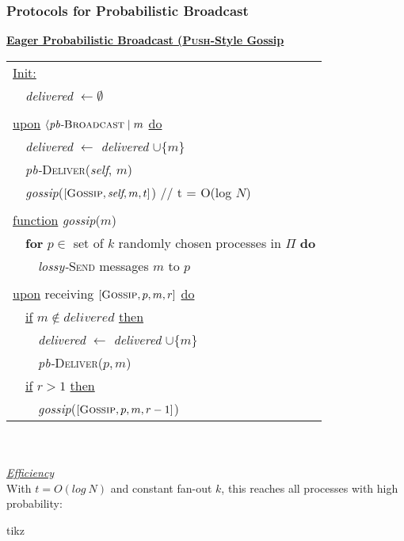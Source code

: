 \documentclass{article}
\begin{document}
\begin{adjustwidth}{2em}{2em}
\begin{adjustwidth}{2em}{2em}
			\subsubsection{Protocols for Probabilistic Broadcast}
			\begin{adjustwidth}{2em}{}
				\underline{\textbf{Eager Probabilistic Broadcast (\textsc{Push}-Style Gossip}} \\
				\begin{tabular}{l}
					\underline{Init:} \\
					\ \ \textit{delivered} $\leftarrow \emptyset$ \\
					\\
					\underline{upon} $\langle \textit{pb-}\textsc{Broadcast} \mid m$ \underline{do} \\
					\ \ \textit{delivered} $\leftarrow$ \textit{delivered} $\cup \{m\}$ \\
					\ \ \textit{pb-}\textsc{Deliver}(\textit{self}, $m$) \\
					\ \ \textit{gossip}($[\textsc{Gossip}, \textit{self}, m, t]$) // t = O(log $N$) \\
					\\
					\underline{function} \textit{gossip}($m$) \\
					\ \ \textbf{for} $p \in$ set of $k$ randomly chosen processes in $\Pi$ \textbf{do} \\
					\ \ \ \ \textit{lossy-}\textsc{Send} messages $m$ to $p$ \\
					\\
					\underline{upon} receiving $[\textsc{Gossip}, p, m, r]$ \underline{do} \\
					\ \ \underline{if} $m \not\in \textit{delivered}$ \underline{then} \\
					\ \ \ \ \textit{delivered} $\leftarrow$ \textit{delivered} $\cup \{ m\}$ \\
					\ \ \ \ \textit{pb-}\textsc{Deliver}($p,m$) \\
					\ \ \underline{if} $r>1$ \underline{then} \\
					\ \ \ \ \textit{gossip}($[\textsc{Gossip}, p, m, r-1]$)
				\end{tabular}
				\hfill \\ \\
				\underline{\textit{Efficiency}} \\
				With $t = O(log \ N)$ and constant fan-out $k$, this reaches all processes with high probability:
				\begin{center}
					tikz
				\end{center}

\end{adjustwidth}
\end{adjustwidth}
\end{adjustwidth}
\end{document}
